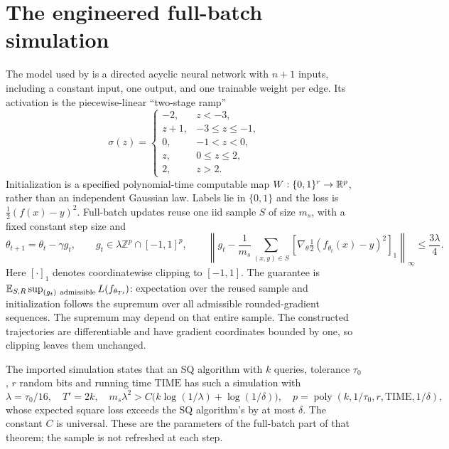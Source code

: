 \section{The engineered full-batch simulation}\label{app:engineered}
The model used by \citet[Theorem~3d]{AKMSS21} is a directed acyclic neural network with $n+1$ inputs, including a constant input, one output, and one trainable weight per edge. Its activation is the piecewise-linear ``two-stage ramp''
\[
 \sigma(z)=\begin{cases}
 -2,&z<-3,\\ z+1,&-3\le z\le-1,\\0,&-1<z<0,\\z,&0\le z\le2,\\2,&z>2.
 \end{cases}
\]
Initialization is a specified polynomial-time computable map $W:\{0,1\}^r\to\mathbb R^p$, rather than an independent Gaussian law. Labels lie in $\{0,1\}$ and the loss is $\tfrac12(f(x)-y)^2$. Full-batch updates reuse one iid sample $S$ of size $m_s$, with a fixed constant step size and
\begin{equation}\label{eq:engineered-gradient}
 \theta_{t+1}=\theta_t-\gamma g_t,\qquad
 g_t\in\lambda\mathbb Z^p\cap[-1,1]^p,\qquad
 \left\|g_t-\frac1{m_s}\sum_{(x,y)\in S}
       [\nabla_\theta\tfrac12(f_{\theta_t}(x)-y)^2]_1\right\|_\infty
 \le\frac{3\lambda}{4}.
\end{equation}
Here $[\cdot]_1$ denotes coordinatewise clipping to $[-1,1]$. The guarantee is $\E_{S,R}\sup_{(g_t)\ \mathrm{admissible}}L(f_{\theta_{T\prime}})$: expectation over the reused sample and initialization follows the supremum over all admissible rounded-gradient sequences. The supremum may depend on that entire sample. The constructed trajectories are differentiable and have gradient coordinates bounded by one, so clipping leaves them unchanged.

The imported simulation states that an SQ algorithm with $k$ queries, tolerance $\tau_0$, $r$ random bits and running time $\mathrm{TIME}$ has such a simulation with
\begin{equation}\label{eq:engineered-parameters}
 \lambda=\tau_0/16,\quad T'=2k,\quad
 m_s\lambda^2>C\bigl(k\log(1/\lambda)+\log(1/\delta)\bigr),\quad
 p=\operatorname{poly}(k,1/\tau_0,r,\mathrm{TIME},1/\delta),
\end{equation}
whose expected square loss exceeds the SQ algorithm's by at most $\delta$. The constant $C$ is universal. These are the parameters of the full-batch part of that theorem; the sample is not refreshed at each step.


